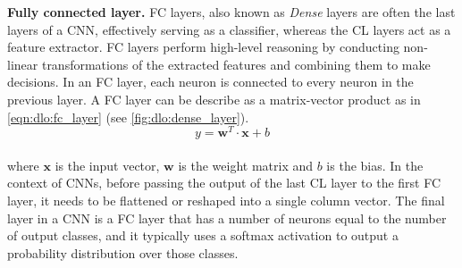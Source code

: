 \noindent \textbf{Fully connected layer.} \ac{FC} layers, also known as
\emph{Dense} layers are often the last layers of a \ac{CNN}, effectively serving
as a classifier, whereas the \ac{CL} layers act as a feature extractor.
\ac{FC} layers perform high-level reasoning by conducting non-linear
transformations of the extracted features and combining them to make decisions.
In an FC layer, each neuron is connected to every neuron in the previous layer.
A \ac{FC} layer can be describe as a matrix-vector product as in
\cref{eqn:dlo:fc_layer} (see \cref{fig:dlo:dense_layer}).\\

\begin{equation}
  \label{eqn:dlo:fc_layer}
  y = \mathbf{w}^T \cdot \mathbf{x} + b
\end{equation}\\

\noindent where $\mathbf{x}$ is the input vector, $\mathbf{w}$ is the weight
matrix and $b$ is the bias. In the context of \acp{CNN}, before passing the
output of the last \ac{CL} layer to the first \ac{FC} layer, it needs to be
flattened or reshaped into a single column vector. The final layer in a \ac{CNN}
is a \ac{FC} layer that has a number of neurons equal to the number of output
classes, and it typically uses a softmax activation to output a probability
distribution over those classes.\\



